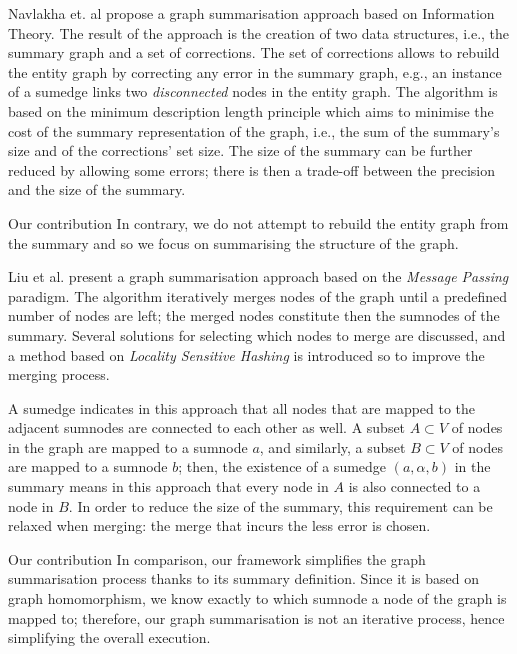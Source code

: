 Navlakha et. al \cite{navlakha:2008:gsb} propose a graph summarisation approach based on Information Theory. The result of the approach is the creation of two data structures, i.e., the summary graph and a set of corrections. The set of corrections allows to rebuild the entity graph by correcting any error in the summary graph, e.g., an instance of a sumedge links two \emph{disconnected} nodes in the entity graph. The algorithm is based on the minimum description length \cite{grunwald:2007:mdl} principle which aims to minimise the cost of the summary representation of the graph, i.e., the sum of the summary's size and of the corrections' set size.
The size of the summary can be further reduced by allowing some errors; there is then a trade-off between the precision and the size of the summary.

\begin{centeremph}{Our contribution}
	In contrary, we do not attempt to rebuild the entity graph from the summary and so we focus on summarising the structure of the graph.
\end{centeremph}

Liu et al. \cite{liu:cikm:2014} present a graph summarisation approach based on the \emph{Message Passing} paradigm. The algorithm iteratively merges nodes of the graph until a predefined number of nodes are left; the merged nodes constitute then the sumnodes of the summary. Several solutions for selecting which nodes to merge are discussed, and a method based on \emph{Locality Sensitive Hashing} \cite{gionis:1999:ssh} is introduced so to improve the merging process.

A sumedge indicates in this approach that all nodes that are mapped to the adjacent sumnodes are connected to each other as well. A subset $A \subset V$ of nodes in the graph are mapped to a sumnode $a$, and similarly, a subset $B \subset V$ of nodes are mapped to a sumnode $b$; then, the existence of a sumedge $(a,\alpha,b)$ in the summary means in this approach that every node in $A$ is also connected to a node in $B$. In order to reduce the size of the summary, this requirement can be relaxed when merging: the merge that incurs the less error is chosen.

\begin{centeremph}{Our contribution}
	In comparison, our framework simplifies the graph summarisation process thanks to its summary definition. Since it is based on graph homomorphism, we know exactly to which sumnode a node of the graph is mapped to; therefore, our graph summarisation is not an iterative process, hence simplifying the overall execution.
\end{centeremph}


